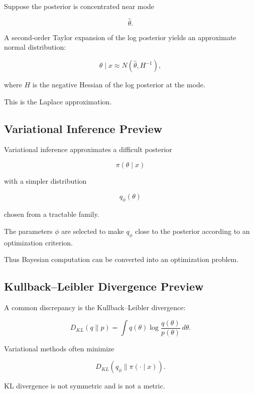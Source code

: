 Suppose the posterior is concentrated near mode

\[
\widehat{\theta}.
\]

A second-order Taylor expansion of the log posterior yields an approximate
normal distribution:

\[
\boxed{
\theta\mid x
\approx
N
\left(
\widehat{\theta},
H^{-1}
\right),
}
\]

where \(H\) is the negative Hessian of the log posterior at the mode.

This is the Laplace approximation.

\subsection{Variational Inference Preview}
\label{subsec:variational-inference-preview}

Variational inference approximates a difficult posterior

\[
\pi(\theta\mid x)
\]

with a simpler distribution

\[
q_\phi(\theta)
\]

chosen from a tractable family.

The parameters \(\phi\) are selected to make \(q_\phi\) close to the
posterior according to an optimization criterion.

Thus Bayesian computation can be converted into an optimization problem.

\subsection{Kullback--Leibler Divergence Preview}
\label{subsec:kl-divergence-bayes}

A common discrepancy is the Kullback--Leibler divergence:

\[
\boxed{
D_{KL}(q\|p)
=
\int
q(\theta)
\log
\frac{
q(\theta)
}{
p(\theta)
}
\,d\theta.
}
\]

Variational methods often minimize

\[
D_{KL}
(
q_\phi
\|
\pi(\cdot\mid x)
).
\]

KL divergence is not symmetric and is not a metric.

